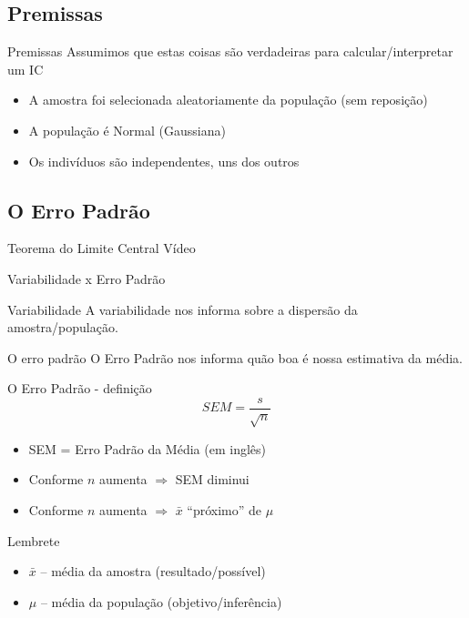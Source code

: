 \documentclass{beamer}
\begin{document}
\subsection{Premissas}

\begin{frame}{\scriptsize Premissas}
  \scriptsize
  Assumimos que estas coisas são verdadeiras para calcular/interpretar um IC
  \bigskip
  \bigskip
  \begin{itemize}
    \scriptsize
  \item A amostra foi selecionada aleatoriamente da população (sem reposição)
  \medskip
  \item A população é Normal (Gaussiana)
  \medskip
  \item Os indivíduos são independentes, uns dos outros
  \end{itemize}
\end{frame}

\subsection{O Erro Padrão}

\begin{frame}{\scriptsize Teorema do Limite Central}
  Vídeo
\end{frame}

\begin{frame}{\scriptsize Variabilidade x Erro Padrão}
  \begin{block}{Variabilidade}
    \footnotesize
    A variabilidade nos informa sobre a dispersão da amostra/população.
  \end{block}
  \begin{block}{O erro padrão}
    \footnotesize
    O Erro Padrão nos informa quão boa é nossa \alert{estimativa} da média.
  \end{block}
\end{frame}

\begin{frame}{\scriptsize O Erro Padrão - definição}
  \begin{displaymath}
    SEM = \frac{s}{\sqrt{n}}
  \end{displaymath}
  \begin{itemize}
    \footnotesize
  \item SEM = Erro Padrão da Média ({\tiny em inglês})
  \item Conforme $n$ aumenta $\Rightarrow$ SEM diminui
  \item Conforme $n$ aumenta $\Rightarrow$ $\bar{x}$ ``próximo'' de $\mu$
  \end{itemize}
  \begin{block}{Lembrete}
    \footnotesize
    \begin{itemize}
    \footnotesize
    \item $\bar{x}$ -- média da amostra (resultado/possível)
    \item $\mu$ -- média da população (objetivo/inferência)
    \end{itemize}
  \end{block}
\end{frame}
\end{document}
